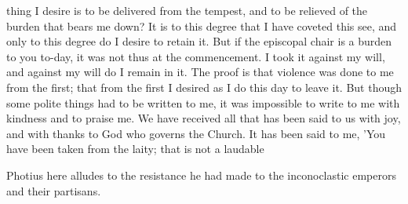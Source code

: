 thing I desire is to be delivered from the tempest, and to be relieved of the burden that bears me down? It is to this degree that I have coveted this see, and only to this degree do I desire to retain it. But if the episcopal chair is a burden to you to-day, it was not thus at the commencement. I took it against my will, and against my will do I remain in it. The proof is that violence was done to me from the first; that from the first I desired as I do this day to leave it. But though some polite things had to be written to me, it was impossible to write to me with kindness and to praise me. We have received all that has been said to us with joy, and with thanks to God who governs the Church. It has been said to me, 'You have been taken from the laity; that is not a laudable

Photius here alludes to the resistance he had made to the inconoclastic emperors and their partisans.

